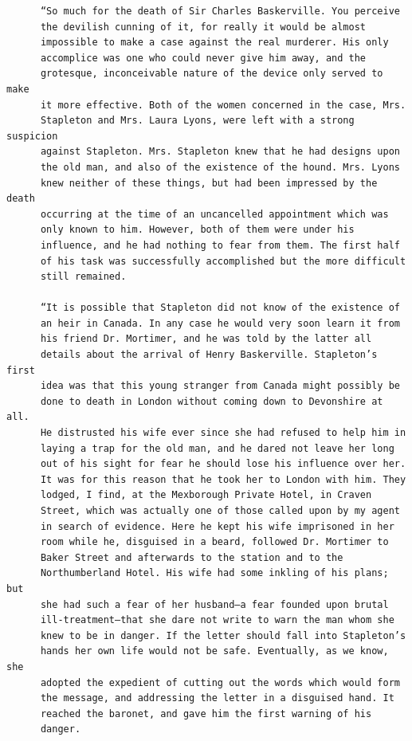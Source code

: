 \documentclass{article}
\begin{document}
\begin{verbatim}
      “So much for the death of Sir Charles Baskerville. You perceive
      the devilish cunning of it, for really it would be almost
      impossible to make a case against the real murderer. His only
      accomplice was one who could never give him away, and the
      grotesque, inconceivable nature of the device only served to make
      it more effective. Both of the women concerned in the case, Mrs.
      Stapleton and Mrs. Laura Lyons, were left with a strong suspicion
      against Stapleton. Mrs. Stapleton knew that he had designs upon
      the old man, and also of the existence of the hound. Mrs. Lyons
      knew neither of these things, but had been impressed by the death
      occurring at the time of an uncancelled appointment which was
      only known to him. However, both of them were under his
      influence, and he had nothing to fear from them. The first half
      of his task was successfully accomplished but the more difficult
      still remained.

      “It is possible that Stapleton did not know of the existence of
      an heir in Canada. In any case he would very soon learn it from
      his friend Dr. Mortimer, and he was told by the latter all
      details about the arrival of Henry Baskerville. Stapleton’s first
      idea was that this young stranger from Canada might possibly be
      done to death in London without coming down to Devonshire at all.
      He distrusted his wife ever since she had refused to help him in
      laying a trap for the old man, and he dared not leave her long
      out of his sight for fear he should lose his influence over her.
      It was for this reason that he took her to London with him. They
      lodged, I find, at the Mexborough Private Hotel, in Craven
      Street, which was actually one of those called upon by my agent
      in search of evidence. Here he kept his wife imprisoned in her
      room while he, disguised in a beard, followed Dr. Mortimer to
      Baker Street and afterwards to the station and to the
      Northumberland Hotel. His wife had some inkling of his plans; but
      she had such a fear of her husband—a fear founded upon brutal
      ill-treatment—that she dare not write to warn the man whom she
      knew to be in danger. If the letter should fall into Stapleton’s
      hands her own life would not be safe. Eventually, as we know, she
      adopted the expedient of cutting out the words which would form
      the message, and addressing the letter in a disguised hand. It
      reached the baronet, and gave him the first warning of his
      danger.


\end{verbatim}
\end{document}
